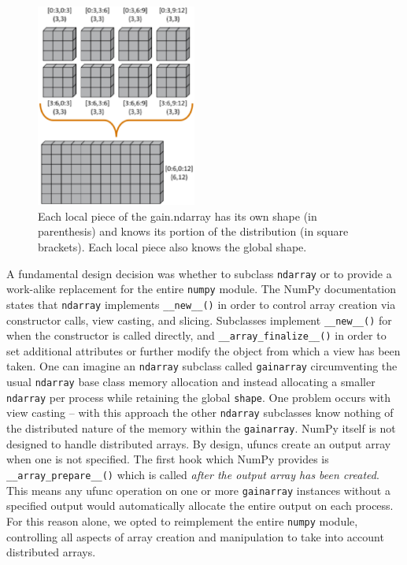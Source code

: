\documentclass{sigplanconf}
\begin{document}
\begin{figure}[htb]
\centering
\includegraphics[width=0.47\textwidth]{image1_crop.eps}
\caption{
Each local piece of the gain.ndarray has its own shape (in parenthesis)
and knows its portion of the distribution (in square brackets).  Each local
piece also knows the global shape.
}
\label{fig:1}
\end{figure}

A fundamental design decision was whether to subclass \verb=ndarray= or to
provide a work-alike replacement for the entire \verb=numpy= module. The NumPy
documentation states that \verb=ndarray= implements \verb=__new__()= in order
to control array creation via constructor calls, view casting, and slicing.
Subclasses implement \verb=__new__()= for when the constructor is called
directly, and \linebreak\verb=__array_finalize__()= in order to set additional
attributes or further modify the object from which a view has been taken. One
can imagine an \verb=ndarray= subclass called \verb=gainarray= circumventing
the usual \verb=ndarray= base class memory allocation and instead allocating a
smaller \verb=ndarray= per process while retaining the global \verb=shape=.
One problem occurs with view casting -- with this approach the other
\verb=ndarray= subclasses know nothing of the distributed nature of the memory
within the \verb=gainarray=. NumPy itself is not designed to handle
distributed arrays. By design, ufuncs create an output array when one is not
specified. The first hook which NumPy provides is \verb=__array_prepare__()=
which is called \emph{after the output array has been created}. This means any
ufunc operation on one or more \verb=gainarray= instances without a specified
output would automatically allocate the entire output on each process. For
this reason alone, we opted to reimplement the entire \verb=numpy= module,
controlling all aspects of array creation and manipulation to take into
account distributed arrays.
\end{document}
